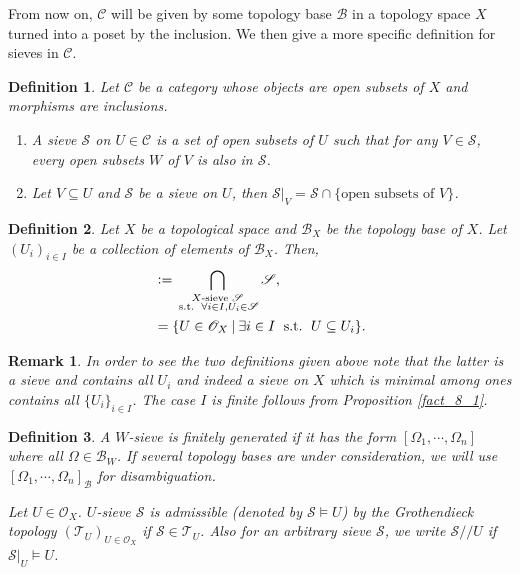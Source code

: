 \documentclass[8pt]{article}
\numberwithin{equation}{section}
\newtheorem{definition}{Definition}[subsection]
\newtheorem{remark}{Remark}[subsection]
\DeclareMathOperator{\straw}{s.t.}
\newcommand{\defeq}{\vcentcolon=}
\newcommand{\Ouv}{\mathscr{O}}
\newcommand{\sep}[0]{\:|\:}
\newcommand{\st}[0]{\:\straw\:}
\newcommand{\sC}[0]{\mathscr{C}}
\newcommand{\sS}[0]{\mathscr{S}}
\newcommand{\cB}[0]{\mathcal{B}}
\begin{document}
From now on, $\sC$ will be given by some topology base $\mathcal{B}$ in a topology space $X$ turned into a poset by the inclusion. We then give a more specific definition for sieves in $\sC$.
\begin{definition}
    Let $\sC$ be a category whose objects are open subsets of $X$ and morphisms are inclusions.
    \begin{enumerate}[1.]
        \item A sieve $\sS$ on $U\in\sC$ is a set of open subsets of $U$ such that for any $V\in\sS$, every open subsets $W$ of $V$ is also in $\sS$.
        \item Let $V\subseteq U$ and $\sS$ be a sieve on $U$, then $\sS|_V = \sS\cap\{\text{open subsets of $V$}\}$.
    \end{enumerate}
\end{definition}
\begin{definition}
    \label{definition_8_3}
    Let $X$ be a topological space and $\cB_X$ be the topology base of $X$. Let $(U_i)_{i\in I}$ be a collection of elements of $\cB_X$. Then,
    \begin{align*}
        [U_i|i\in I]&\defeq \bigcap_{\substack{\text{$X$-sieve $\mathscr{S}$}\\ \st\:\forall i\in I,U_i\in\sS}}\sS,\\
        & =\{U\in\mathscr{O}_X\sep \exists i\in I\:\st\: U\subseteq U_i\}.
    \end{align*}
\end{definition}
\begin{remark}
    In order to see the two definitions given above note that the latter is a sieve and contains all $U_i$ and indeed a sieve on $X$ which is minimal among ones contains all $\{U_i\}_{i\in I}$. The case $I$ is finite follows from Proposition \ref{fact_8_1}.
\end{remark}
\begin{definition}
    A $W$-sieve is finitely generated if it has the form $[\Omega_1,\cdots,\Omega_n]$ where all $\Omega\in\mathcal{B}_W$. If several topology bases are under consideration, we will use $[\Omega_1,\cdots,\Omega_n]_\mathcal{B}$ for disambiguation.
    \par Let $U\in\Ouv_X$. $U$-sieve $\sS$ is admissible (denoted by $\sS\vDash U$) by the Grothendieck topology $(\mathcal{T}_U)_{U\in\Ouv_X}$ if $\sS\in\mathcal{T}_U$. Also for an arbitrary sieve $\sS$, we write $\sS//U$ if $\sS|_U\vDash U$.
\end{definition}
\end{document}
